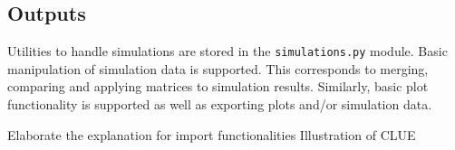 \subsection{Outputs}
Utilities to handle simulations are stored in the \texttt{simulations.py} module. 
Basic manipulation of simulation data is supported.
This corresponds to merging, comparing and applying matrices to  simulation results.
Similarly, basic plot functionality is supported as well as exporting plots and/or simulation data.
 
Elaborate the explanation for import functionalities 
Illustration of CLUE

